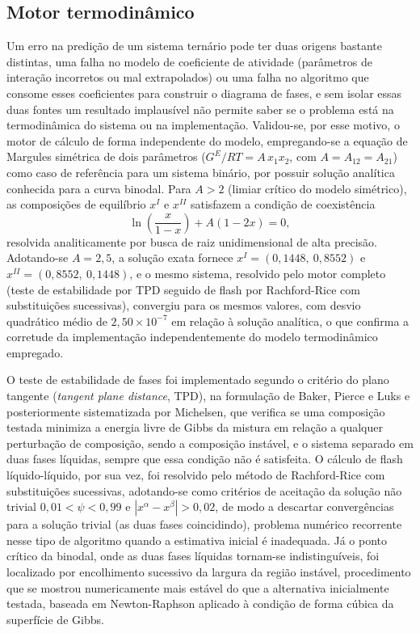 \subsection{Motor termodinâmico}
\label{subsec:motor_termodinamico}

Um erro na predição de um sistema ternário pode ter duas origens bastante distintas, uma falha no modelo de coeficiente de atividade (parâmetros de interação incorretos ou mal extrapolados) ou uma falha no algoritmo que consome esses coeficientes para construir o diagrama de fases, e sem isolar essas duas fontes um resultado implausível não permite saber se o problema está na termodinâmica do sistema ou na implementação. Validou-se, por esse motivo, o motor de cálculo de forma independente do modelo, empregando-se a equação de Margules simétrica de dois parâmetros ($G^E/RT = A\,x_1 x_2$, com $A = A_{12} = A_{21}$) como caso de referência para um sistema binário, por possuir solução analítica conhecida para a curva binodal. Para $A > 2$ (limiar crítico do modelo simétrico), as composições de equilíbrio $x^{I}$ e $x^{II}$ satisfazem a condição de coexistência
\[
\ln\!\left(\frac{x}{1-x}\right) + A(1-2x) = 0,
\]
resolvida analiticamente por busca de raiz unidimensional de alta precisão. Adotando-se $A = 2{,}5$, a solução exata fornece $x^{I} = (0{,}1448,\ 0{,}8552)$ e $x^{II} = (0{,}8552,\ 0{,}1448)$, e o mesmo sistema, resolvido pelo motor completo (teste de estabilidade por TPD seguido de flash por Rachford-Rice com substituições sucessivas), convergiu para os mesmos valores, com desvio quadrático médio de $2{,}50 \times 10^{-7}$ em relação à solução analítica, o que confirma a corretude da implementação independentemente do modelo termodinâmico empregado.

O teste de estabilidade de fases foi implementado segundo o critério do plano tangente (\textit{tangent plane distance}, TPD), na formulação de Baker, Pierce e Luks e posteriormente sistematizada por Michelsen, que verifica se uma composição testada minimiza a energia livre de Gibbs da mistura em relação a qualquer perturbação de composição, sendo a composição instável, e o sistema separado em duas fases líquidas, sempre que essa condição não é satisfeita. O cálculo de flash líquido-líquido, por sua vez, foi resolvido pelo método de Rachford-Rice com substituições sucessivas, adotando-se como critérios de aceitação da solução não trivial $0{,}01 < \psi < 0{,}99$ e $|x^{\alpha} - x^{\beta}| > 0{,}02$, de modo a descartar convergências para a solução trivial (as duas fases coincidindo), problema numérico recorrente nesse tipo de algoritmo quando a estimativa inicial é inadequada. Já o ponto crítico da binodal, onde as duas fases líquidas tornam-se indistinguíveis, foi localizado por encolhimento sucessivo da largura da região instável, procedimento que se mostrou numericamente mais estável do que a alternativa inicialmente testada, baseada em Newton-Raphson aplicado à condição de forma cúbica da superfície de Gibbs.

